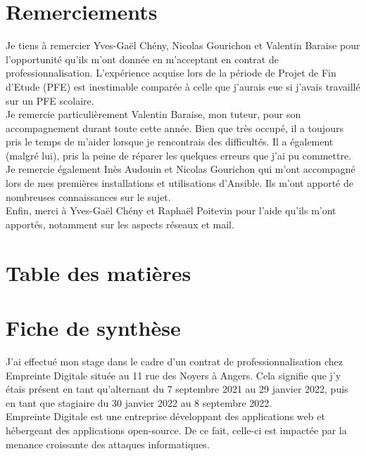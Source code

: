 \documentclass[12pt, a4paper, twoside]{article}
\begin{document}
\newpage
\section*{Remerciements}
Je tiens à remercier Yves-Gaël Chény, Nicolas Gourichon et Valentin Baraise pour l'opportunité qu'ils m'ont donnée en m'acceptant en contrat de professionnalisation. 
L'expérience acquise lors de la période de Projet de Fin d'Etude (\gls{PFE}) est inestimable comparée à celle que j'aurais eue si j'avais travaillé sur un \gls{PFE} scolaire. \\

Je remercie particulièrement Valentin Baraise, mon tuteur, pour son accompagnement durant toute cette année. 
Bien que très occupé, il a toujours pris le temps de m'aider lorsque je rencontrais des difficultés. 
Il a également (malgré lui), pris la peine de réparer les quelques erreurs que j'ai pu commettre. \\

Je remercie également Inès Audouin et Nicolas Gourichon qui m'ont accompagné lors de mes premières installations et utilisations d'\gls{Ansible}. 
Ils m'ont apporté de nombreuses connaissances sur le sujet. \\

Enfin, merci à Yves-Gaël Chény et Raphaël Poitevin pour l'aide qu'ils m'ont apportés, notamment sur les aspects réseaux et mail.


\newpage
\section*{Table des matières}
\tableofcontents

\newpage
\section*{Fiche de synthèse}
J'ai effectué mon stage dans le cadre d'un contrat de professionnalisation chez Empreinte Digitale située au 11 rue des Noyers à Angers.
Cela signifie que j'y étais présent en tant qu'alternant du 7 septembre 2021 au 29 janvier 2022, puis en tant que stagiaire du 30 janvier 2022 au 8 septembre 2022. \\

Empreinte Digitale est une entreprise développant des applications web et hébergeant des applications open-source.
De ce fait, celle-ci est impactée par la menance croissante des attaques informatiques.\\
\end{document}
